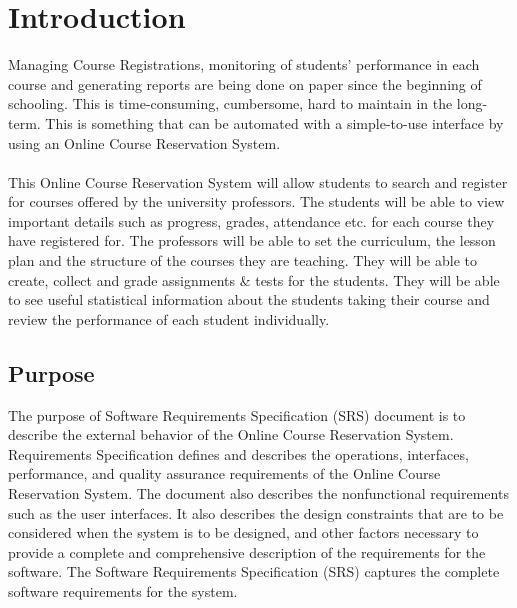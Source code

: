 \documentclass[12pt, a4]{report}
\begin{document}
\maketitle
\newpage
\tableofcontents


\newpage
\chapter{Introduction}
Managing Course Registrations, monitoring of students' performance in each course and generating reports are being done on paper since the beginning of schooling. This is time-consuming, cumbersome, hard to maintain in the long-term. This is something that can be automated with a simple-to-use interface by using an Online Course Reservation System.
\\\\
This Online Course Reservation System will allow students to search and register for courses offered by the university professors. The students will be able to view important details such as progress, grades, attendance etc. for each course they have registered for.
The professors will be able to set the curriculum, the lesson plan and the structure of the courses they are teaching. They will be able to create, collect and grade assignments \& tests for the students. They will be able to see useful statistical information about the students taking their course and review the performance of each student individually.


\section{Purpose}
The purpose of Software Requirements Specification (SRS) document is to describe the external behavior of the Online Course Reservation System. Requirements Specification defines and describes the operations, interfaces, performance, and quality assurance requirements of the Online Course Reservation System. The document also describes the nonfunctional requirements such as the user interfaces.
It also describes the design constraints that are to be considered when the system is to be designed, and other factors necessary to
provide a complete and comprehensive description of the requirements for the software. The Software Requirements Specification (SRS) captures the complete software requirements for the system.
\end{document}
